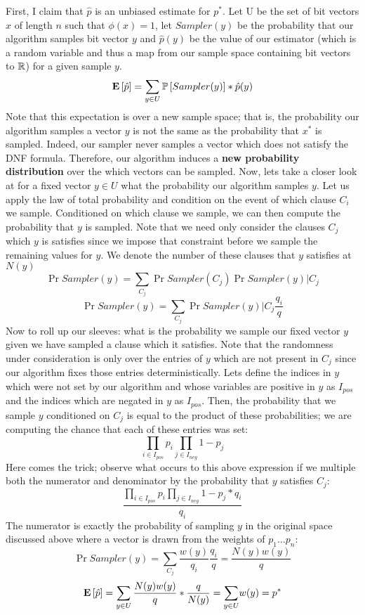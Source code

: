 \documentclass[12pt]{article}
\begin{document}
\begin{solution}
\begin{answerbox}
\begin{algorithmic}
\EndProcedure
\end{algorithmic}
\end{answerbox}
First, I claim that $\hat{p}$ is an unbiased estimate for $p^*$. Let U be the set of bit vectors $x$ of length $n$ such that $\phi(x) = 1$, let $Sampler(y)$ be the probability that our algorithm samples bit vector $y$ and $\hat{p}(y)$ be the value of our estimator (which is a random variable and thus a map from our sample space containing bit vectors to $\mathbb{R}$) for a given sample $y$. 
\[
\mathbf{E}\left[\hat{p}\right] = \sum_{y\in U}{\mathbb{P}\left[Sampler(y)\right]*\hat{p}(y)}
\]
Note that this expectation is over a new sample space; that is, the probability our algorithm samples a vector $y$ is not the same as the probability that $x^*$ is sampled. Indeed, our sampler never samples a vector which does not satisfy the DNF formula. Therefore, our algorithm induces a \textbf{new probability distribution} over the which vectors can be sampled. Now, lets take a closer look at for a fixed vector $y\in U$ what the probability our algorithm samples $y$. Let us apply the law of total probability and condition on the event of which clause $C_i$ we sample. Conditioned on which clause we sample, we can then compute the probability that $y$ is sampled. Note that we need only consider the clauses $C_j$ which $y$ is satisfies since we impose that constraint before we sample the remaining values for $y$. We denote the number of these clauses that $y$ satisfies at $N(y)$
\[
\Pr{Sampler(y)} = \sum_{C_j}{\Pr{Sampler(C_j)}\Pr{Sampler(y) | C_j}}
\]
\[
\Pr{Sampler(y)} = \sum_{C_j}{\Pr{Sampler(y) | C_j}\frac{q_i}{q}}
\]
Now to roll up our sleeves: what is the probability we sample our fixed vector $y$ given we have sampled a clause which it satisfies. Note that the randomness under consideration is only over the entries of $y$ which are not present in $C_j$ since our algorithm fixes those entries deterministically. Lets define the indices in $y$ which were not set by our algorithm and whose variables are positive in $y$ as $I_{pos}$ and the indices which are negated in $y$ as $I_{pos}$. Then, the probability that we sample $y$ conditioned on $C_j$ is equal to the product of these probabilities; we are computing the chance that each of these entries was set:
\[
\prod_{i \in I_{pos}}{p_i}\prod_{j \in I_{neg}}{1-p_j}
\]
Here comes the trick; observe what occurs to this above expression if we multiple both the numerator and denominator by the probability that $y$ satisfies $C_j$:
\[
\frac{\prod_{i \in I_{pos}}{p_i}\prod_{j \in I_{neg}}{1-p_j} * q_i}{q_i}
\]
The numerator is exactly the probability of sampling $y$ in the original space discussed above where a vector is drawn from the weights of $p_1 \dots p_n$:
\[
\Pr{Sampler(y)} = \sum_{C_j}{\frac{w(y)}{q_i}\frac{q_i}{q}} = \frac{N(y)w(y)}{q}
\]
\[
\mathbf{E}\left[\hat{p}\right] = \sum_{y\in U}{\frac{N(y)w(y)}{q}*\frac{q}{N(y)} = \sum_{y\in U}}w(y) = p^*
\] \\


\end{solution}
\end{document}
